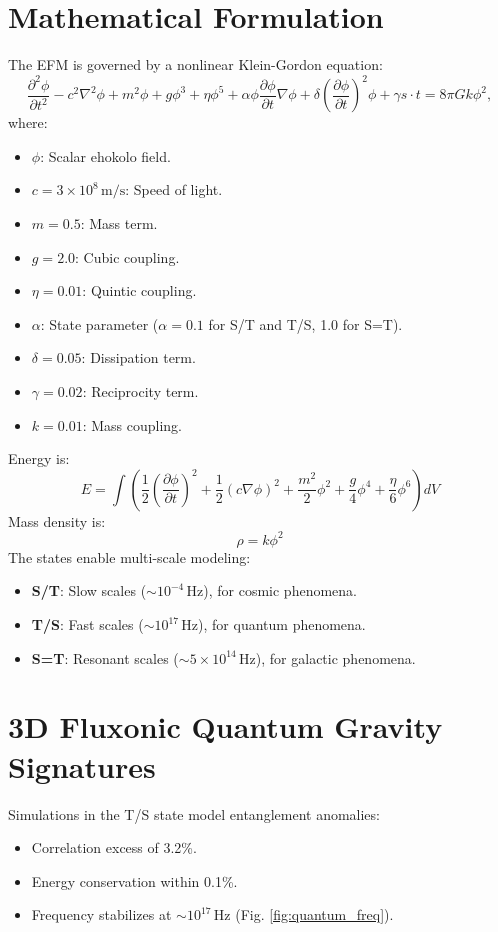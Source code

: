 \documentclass[11pt]{article}
\begin{document}
\section{Mathematical Formulation}
The EFM is governed by a nonlinear Klein-Gordon equation:
\begin{equation}
\frac{\partial^2 \phi}{\partial t^2} - c^2 \nabla^2 \phi + m^2 \phi + g \phi^3 + \eta \phi^5 + \alpha \phi \frac{\partial \phi}{\partial t} \nabla \phi + \delta \left(\frac{\partial \phi}{\partial t}\right)^2 \phi + \gamma s \cdot t = 8 \pi G k \phi^2,
\end{equation}
where:
\begin{itemize}
    \item \(\phi\): Scalar ehokolo field.
    \item \(c = 3 \times 10^8 \, \text{m/s}\): Speed of light.
    \item \(m = 0.5\): Mass term.
    \item \(g = 2.0\): Cubic coupling.
    \item \(\eta = 0.01\): Quintic coupling.
    \item \(\alpha\): State parameter (\(\alpha = 0.1\) for S/T and T/S, 1.0 for S=T).
    \item \(\delta = 0.05\): Dissipation term.
    \item \(\gamma = 0.02\): Reciprocity term.
    \item \(k = 0.01\): Mass coupling.
\end{itemize}
Energy is:
\begin{equation}
E = \int \left( \frac{1}{2} \left(\frac{\partial \phi}{\partial t}\right)^2 + \frac{1}{2} (c \nabla \phi)^2 + \frac{m^2}{2} \phi^2 + \frac{g}{4} \phi^4 + \frac{\eta}{6} \phi^6 \right) dV
\end{equation}
Mass density is:
\begin{equation}
\rho = k \phi^2
\end{equation}
The states enable multi-scale modeling:
\begin{itemize}
    \item \textbf{S/T}: Slow scales (\(\sim 10^{-4} \, \text{Hz}\)), for cosmic phenomena.
    \item \textbf{T/S}: Fast scales (\(\sim 10^{17} \, \text{Hz}\)), for quantum phenomena.
    \item \textbf{S=T}: Resonant scales (\(\sim 5 \times 10^{14} \, \text{Hz}\)), for galactic phenomena.
\end{itemize}

\section{3D Fluxonic Quantum Gravity Signatures}
Simulations in the T/S state model entanglement anomalies:
\begin{itemize}
    \item Correlation excess of 3.2\%.
    \item Energy conservation within 0.1\%.
    \item Frequency stabilizes at \(\sim 10^{17} \, \text{Hz}\) (Fig. \ref{fig:quantum_freq}).
\end{itemize}
\end{document}

